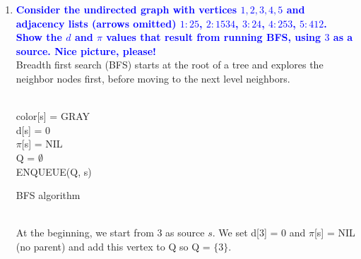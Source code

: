 \documentclass[11pt]{article}
\begin{document}
\begin{enumerate}
\item \textbf{\textcolor{blue}{Consider the undirected graph with vertices $1,2,3,4,5$ and adjacency lists (arrows omitted) $1:25$, $2:1534$, $3:24$, $4:253$, $5:412$.  Show the $d$ and
$\pi$ values that result from running BFS, using $3$ as a source.  Nice picture, please!}}
    \\ Breadth first search (BFS) starts at the root of a tree and explores the neighbor nodes first, before moving to the next level neighbors.
    \begin{algorithm}
    \Indm{}\\
    \Indp
        color[s] = GRAY \\
        d[s] = 0 \\
        $\pi$[s] = NIL \\
        Q = $\emptyset$ \\
        ENQUEUE(Q, s) \\
    \caption{BFS algorithm}
    \end{algorithm}
    \\ At the beginning, we start from 3 as source $s$. We set d[3] = 0 and $\pi$[s] = NIL (no parent) and add this vertex to Q so Q = $\{3\}$. \\
\end{enumerate}
\end{document}
